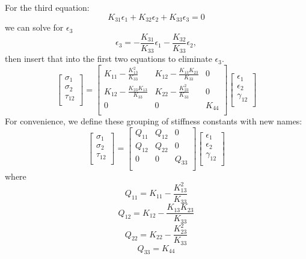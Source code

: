 \documentclass{article}
\begin{document}
For the third equation:
\begin{equation}
    K_{31}\epsilon_1 + K_{32}\epsilon_2 + K_{33}\epsilon_3 = 0
\end{equation}
we can solve for $\epsilon_3$
\begin{equation}
    \epsilon_3 = -\frac{K_{31}}{K_{33}}\epsilon_1 - \frac{K_{32}}{K_{33}}\epsilon_2,
\end{equation}
then insert that into the first two equations to eliminate $\epsilon_3$.
\begin{equation}
\left[
\begin{matrix}
\sigma_{1}\\
\sigma_{2}\\
\tau_{12}\\
\end{matrix}
\right]
=
\left[
\begin{matrix}
K_{11} - \frac{K_{13}^2}{K_{33}} & K_{12} - \frac{K_{13}K_{23}}{K_{33}} & 0 \\
K_{12} - \frac{K_{23}K_{13}}{K_{33}} & K_{22} - \frac{K_{23}^2}{K_{33}} & 0 \\
0 & 0  & K_{44} \\
\end{matrix}
\right]
\left[
\begin{matrix}
\epsilon_{1}\\
\epsilon_{2}\\
\gamma_{12}\\
\end{matrix}
\right]
\end{equation}
For convenience, we define these grouping of stiffness constants with new names:
\begin{equation}
\left[
\begin{matrix}
\sigma_{1}\\
\sigma_{2}\\
\tau_{12}\\
\end{matrix}
\right]
=
\left[
\begin{matrix}
Q_{11} & Q_{12} & 0 \\
Q_{12} & Q_{22} & 0 \\
0 & 0  & Q_{33} \\
\end{matrix}
\right]
\left[
\begin{matrix}
\epsilon_{1}\\
\epsilon_{2}\\
\gamma_{12}\\
\end{matrix}
\right]
\end{equation}
where
\begin{equation}
Q_{11} = K_{11} - \frac{K_{13}^2}{K_{33}}
\end{equation}
\begin{equation}
Q_{12} = K_{12} - \frac{K_{13}K_{23}}{K_{33}}
\end{equation}
\begin{equation}
Q_{22} = K_{22} - \frac{K_{23}^2}{K_{33}}
\end{equation}
\begin{equation}
Q_{33} = K_{44}
\end{equation}
\end{document}
